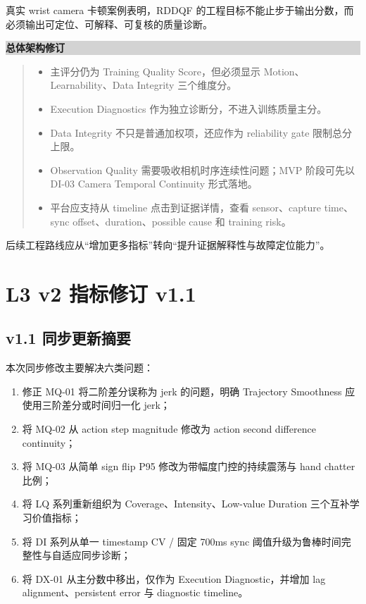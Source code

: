 \documentclass[UTF8,zihao=-4,oneside,openany]{ctexrep}
\newenvironment{decisionbox}[1]{\vspace{0.5em}\noindent\colorbox{LightGray}{\parbox{0.96\linewidth}{\textbf{#1}}}\par\vspace{-0.2em}\begin{quote}\small}{\end{quote}\vspace{0.3em}}
\begin{document}
真实 wrist camera 卡顿案例表明，RDDQF 的工程目标不能止步于输出分数，而必须输出可定位、可解释、可复核的质量诊断。

\begin{decisionbox}{总体架构修订}
\begin{itemize}
\item 主评分仍为 Training Quality Score，但必须显示 Motion、Learnability、Data Integrity 三个维度分。
\item Execution Diagnostics 作为独立诊断分，不进入训练质量主分。
\item Data Integrity 不只是普通加权项，还应作为 reliability gate 限制总分上限。
\item Observation Quality 需要吸收相机时序连续性问题；MVP 阶段可先以 DI-03 Camera Temporal Continuity 形式落地。
\item 平台应支持从 timeline 点击到证据详情，查看 sensor、capture time、sync offset、duration、possible cause 和 training risk。
\end{itemize}
\end{decisionbox}

后续工程路线应从“增加更多指标”转向“提升证据解释性与故障定位能力”。

\clearpage

\chapter{L3 v2 指标修订 v1.1}

\section{v1.1 同步更新摘要}

本次同步修改主要解决六类问题：

\begin{enumerate}
\item 修正 MQ-01 将二阶差分误称为 jerk 的问题，明确 Trajectory Smoothness 应使用三阶差分或时间归一化 jerk；
\item 将 MQ-02 从 action step magnitude 修改为 action second difference continuity；
\item 将 MQ-03 从简单 sign flip P95 修改为带幅度门控的持续震荡与 hand chatter 比例；
\item 将 LQ 系列重新组织为 Coverage、Intensity、Low-value Duration 三个互补学习价值指标；
\item 将 DI 系列从单一 timestamp CV / 固定 700ms sync 阈值升级为鲁棒时间完整性与自适应同步诊断；
\item 将 DX-01 从主分数中移出，仅作为 Execution Diagnostic，并增加 lag alignment、persistent error 与 diagnostic timeline。
\end{enumerate}
\end{document}
